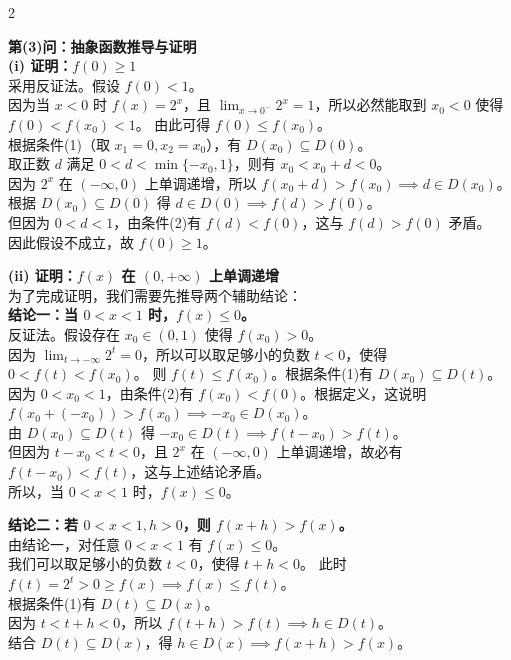 \documentclass[11pt,a4paper]{ctexart}
\begin{document}
\begin{paracol}{2}
{  \textbf{第(3)问：抽象函数推导与证明}\\
  \textbf{(i) 证明：$f(0) \ge 1$}\\
  采用反证法。假设 $f(0) < 1$。\\
  因为当 $x < 0$ 时 $f(x) = 2^x$，且 $\lim_{x\to 0^-} 2^x = 1$，所以必然能取到 $x_0 < 0$ 使得 $f(0) < f(x_0) < 1$。
  由此可得 $f(0) \le f(x_0)$。\\
  根据条件(1)（取 $x_1 = 0, x_2 = x_0$），有 $D(x_0) \subseteq D(0)$。\\
  取正数 $d$ 满足 $0 < d < \min\{-x_0, 1\}$，则有 $x_0 < x_0+d < 0$。\\
  因为 $2^x$ 在 $(-\infty, 0)$ 上单调递增，所以 $f(x_0+d) > f(x_0) \implies d \in D(x_0)$。\\
  根据 $D(x_0) \subseteq D(0)$ 得 $d \in D(0) \implies f(d) > f(0)$。\\
  但因为 $0 < d < 1$，由条件(2)有 $f(d) < f(0)$，这与 $f(d) > f(0)$ 矛盾。\\
  因此假设不成立，故 $\boxed{f(0) \ge 1}$。

  \textbf{(ii) 证明：$f(x)$ 在 $(0, +\infty)$ 上单调递增}\\
  为了完成证明，我们需要先推导两个辅助结论：\\
  \textbf{结论一：当 $0 < x < 1$ 时，$f(x) \le 0$。}\\
  反证法。假设存在 $x_0 \in (0, 1)$ 使得 $f(x_0) > 0$。\\
  因为 $\lim_{t\to-\infty} 2^t = 0$，所以可以取足够小的负数 $t < 0$，使得 $0 < f(t) < f(x_0)$。
  则 $f(t) \le f(x_0)$。根据条件(1)有 $D(x_0) \subseteq D(t)$。\\
  因为 $0 < x_0 < 1$，由条件(2)有 $f(x_0) < f(0)$。根据定义，这说明 $f(x_0 + (-x_0)) > f(x_0) \implies -x_0 \in D(x_0)$。\\
  由 $D(x_0) \subseteq D(t)$ 得 $-x_0 \in D(t) \implies f(t - x_0) > f(t)$。\\
  但因为 $t - x_0 < t < 0$，且 $2^x$ 在 $(-\infty, 0)$ 上单调递增，故必有 $f(t - x_0) < f(t)$，这与上述结论矛盾。\\
  所以，当 $0 < x < 1$ 时，$f(x) \le 0$。
  
  \textbf{结论二：若 $0 < x < 1, h > 0$，则 $f(x+h) > f(x)$。}\\
  由结论一，对任意 $0 < x < 1$ 有 $f(x) \le 0$。\\
  我们可以取足够小的负数 $t < 0$，使得 $t+h < 0$。
  此时 $f(t) = 2^t > 0 \ge f(x) \implies f(x) \le f(t)$。\\
  根据条件(1)有 $D(t) \subseteq D(x)$。\\
  因为 $t < t+h < 0$，所以 $f(t+h) > f(t) \implies h \in D(t)$。\\
  结合 $D(t) \subseteq D(x)$，得 $h \in D(x) \implies f(x+h) > f(x)$。

}
\end{paracol}
\end{document}
